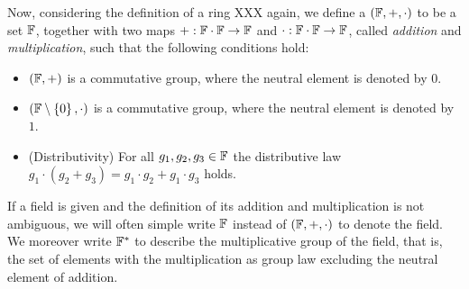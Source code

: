 Now, considering the definition of a ring XXX again, we define a  $ (\mathbb{F}, +, \cdot) $ to be a set $ \mathbb{F}$, together with two maps $ +: \mathbb{F} \cdot \mathbb{F} \to \mathbb{F} $ and $ \cdot: \mathbb{F} \cdot \mathbb{F} \to \mathbb{F} $, called \textit{addition} and \textit{multiplication}, such that the following conditions hold:
\begin{itemize}
\item $ \left (\mathbb{F}, + \right) $ is a commutative group, where the neutral element is denoted by $ 0 $.
\item $ \left (\mathbb{F} \setminus \left \{0 \right \}, \cdot \right) $ is a commutative group, where the neutral element is denoted by $ 1 $.
\item (Distributivity) For all $ g_1, g_2, g_3 \in \mathbb{F} $ the distributive law
$g_1 \cdot \left (g_2 + g_3 \right) = g_1 \cdot g_2 + g_1 \cdot g_3$ holds.
\end{itemize}
If a field is given and the definition of its addition and multiplication is not ambiguous, we will often simple write $\mathbb{F}$ instead of $(\mathbb{F},+,\cdot)$ to denote the field. We moreover write $\mathbb{F}^*$ to describe the multiplicative group of the field, that is, the set of elements with the multiplication as group law excluding the neutral element of addition.

